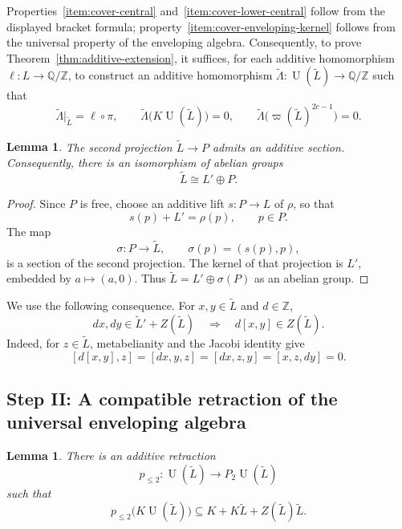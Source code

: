 \documentclass[a4paper,11pt,reqno]{amsart}
\newtheorem{lemma}[theorem]{Lemma}
\theoremstyle{definition}
\newcommand{\Z}{\mathbb Z}
\newcommand{\Q}{\mathbb Q}
\newcommand{\D}{\Q/\Z}
\newcommand{\U}{\operatorname U}
\begin{document}
Properties~\ref{item:cover-central}
and~\ref{item:cover-lower-central} follow from the displayed bracket formula;
property~\ref{item:cover-enveloping-kernel} follows from the universal
property of the enveloping algebra.
Consequently, to prove Theorem~\ref{thm:additive-extension}, it suffices,
for each additive homomorphism $\ell:L\to\D$, to construct an additive
homomorphism
$\widetilde\Lambda:\U(\widetilde L)\to\D$ such that
\begin{equation}\label{eq:Lambda-tilde}
 \widetilde\Lambda|_{\widetilde L}=\ell\circ\pi,
 \qquad
 \widetilde\Lambda\bigl(K\U(\widetilde L)\bigr)=0,
 \qquad
 \widetilde\Lambda\bigl(\varpi(\widetilde L)^{2c-1}\bigr)=0.
\end{equation}
\begin{lemma}\label{lem:additive-decomposition}
The second projection $\widetilde L\to P$ admits an additive section.
Consequently, there is an isomorphism of abelian groups
\[
                         \widetilde L\cong L'\oplus P.
\]
\end{lemma}

\begin{proof}
Since $P$ is free, choose an additive lift $s:P\to L$ of $\rho$, so that
\[
                          s(p)+L'=\rho(p),
                          \qquad p\in P.
\]
The map
\[
 \sigma:P\longrightarrow\widetilde L,
 \qquad
 \sigma(p)=(s(p),p),
\]
is a section of the second projection.  The kernel of that projection is
$L'$, embedded by $a\mapsto(a,0)$.  Thus
$\widetilde L=L'\oplus\sigma(P)$ as an abelian group.
\end{proof}

We use the following consequence.  For $x,y\in\widetilde L$ and $d\in\Z$,
\begin{equation}\label{eq:central-divisibility}
 d x,d y\in\widetilde L'+Z(\widetilde L)
 \quad\Longrightarrow\quad
 d[x,y]\in Z(\widetilde L).
\end{equation}
Indeed, for $z\in\widetilde L$, metabelianity and the Jacobi identity give
\[
 [d[x,y],z]=[dx,y,z]=[dx,z,y]=[x,z,dy]=0.
\]

\subsection*{Step II: A compatible retraction of the universal enveloping
algebra}

\begin{lemma}\label{lem:adapted-PBW}
There is an additive retraction
\[
 p_{\leq2}:\U(\widetilde L)\longrightarrow P_2\U(\widetilde L)
\]
such that
\[
 p_{\leq2}\bigl(K\U(\widetilde L)\bigr)
 \subseteq K+K\widetilde L+Z(\widetilde L)\widetilde L.
\]
\end{lemma}
\end{document}
